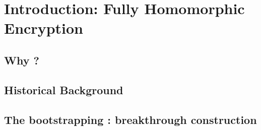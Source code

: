 \chapter{Introduction: Fully Homomorphic Encryption}



\section{Why ?}





\section{Historical Background}





\section{The bootstrapping : breakthrough construction}

